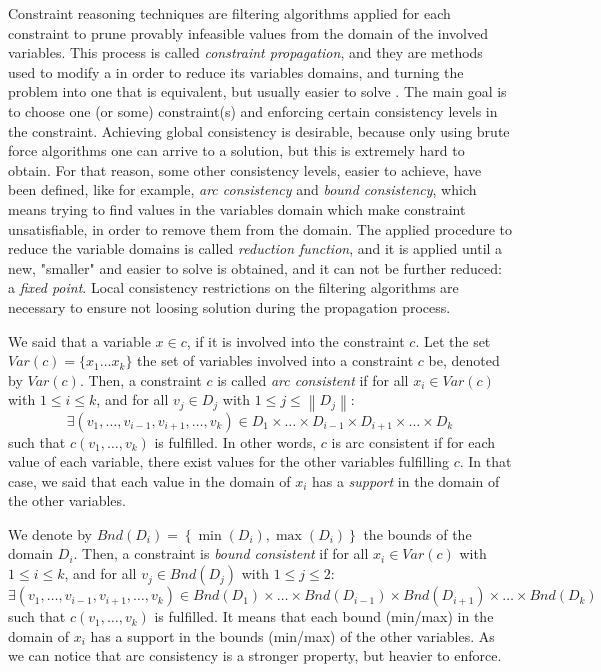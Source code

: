 Constraint reasoning techniques are filtering algorithms applied for each constraint to prune provably infeasible values from the domain of the involved variables. This process is called \textit{constraint propagation}, and they are methods used to modify a \CSP{} in order to reduce its variables domains, and turning the problem into one that is equivalent, but usually easier to solve \cite{ChristianBessiere2006}. The main goal is to choose one (or some) constraint(s) and enforcing certain consistency levels in the constraint. Achieving global consistency is desirable, because only using brute force algorithms one can arrive to a solution, but this is extremely hard to obtain. For that reason, some other consistency levels, easier to achieve, have been defined, like for example, \textit{arc consistency} and \textit{bound consistency}, which means trying to find values in the variables domain which make constraint unsatisfiable, in order to remove them from the domain. The applied procedure to reduce the variable domains is called \textit{reduction function}, and it is applied until a new, "smaller" and easier to solve is obtained, and it can not be further reduced: a \textit{fixed point}. Local consistency restrictions on the filtering algorithms are necessary to ensure not loosing solution during the propagation process.

We said that a variable $x \in c$, if it is involved into the constraint $c$. Let the set $Var(c) = \{x_1\dots x_k\}$ the set of variables  involved into a constraint $c$ be, denoted by $Var(c)$. Then, a constraint $c$ is called \textit{arc consistent} if for all $x_i \in Var(c)$ with $1\leq i\leq k$, and for all $v_j \in D_j$ with $1\leq j\leq \left\|D_j\right\|$:
\[
\exists (v_1, \dots, v_{i-1}, v_{i+1},\dots, v_k) \in D_1\times\dots\times D_{i-1}\times D_{i+1}\times\dots\times D_k
\]
such that $c(v_1, \dots, v_k)$ is fulfilled. In other words, $c$ is arc consistent if for each value of each variable, there exist values for the other variables fulfilling $c$. In that case, we said that each value in the domain of $x_i$ has a \textit{support} in the domain of the other variables.

We denote by $Bnd(D_i) = \left\{\min(D_i), \max(D_i)\right\}$ the bounds of the domain $D_i$. Then, a constraint is \textit{bound consistent} if for all $x_i \in Var(c)$ with $1\leq i\leq k$, and for all $v_j \in Bnd(D_j)$ with $1\leq j\leq 2$:
\[
\exists (v_1, \dots, v_{i-1}, v_{i+1},\dots, v_k) \in Bnd\left(D_1\right)\times\dots\times Bnd\left(D_{i-1}\right)\times Bnd\left(D_{i+1}\right)\times\dots\times Bnd\left(D_k\right)
\]
such that $c(v_1, \dots, v_k)$ is fulfilled. It means that each bound (min/max) in the domain of $x_i$ has a support in the bounds (min/max) of the other variables. As we can notice that arc consistency is a stronger property, but heavier to enforce.


